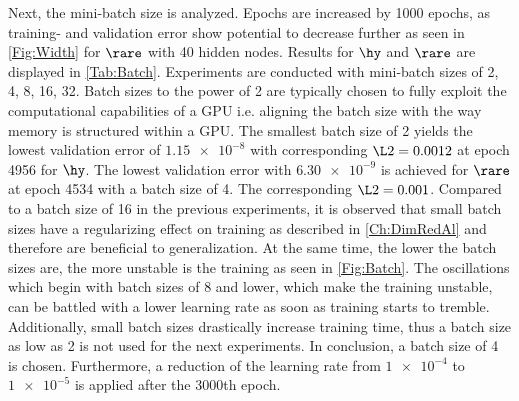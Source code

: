 Next, the mini-batch size is analyzed. Epochs are increased by 1000 epochs, as training- and validation error show potential to decrease further as seen in \cref{Fig:Width} for \(\rare\) with 40 hidden nodes. Results for $\hy$  and  $\rare$ are displayed in \cref{Tab:Batch}. Experiments are conducted with mini-batch sizes of 2, 4, 8, 16, 32. Batch sizes to the power of 2 are typically chosen to fully exploit the computational capabilities of a GPU i.e. aligning the batch size with the way memory is structured within a GPU. The smallest batch size of 2 yields the lowest validation error of \(\num{1.15e-8}\) with corresponding \(\L2 = 0.0012\) at epoch 4956 for \(\hy\). The lowest validation error with \(\num{6.30e-9}\) is achieved for \(\rare\) at epoch 4534 with a batch size of 4. The corresponding \(\L2 = 0.001\). Compared to a batch size of 16 in the previous experiments, it is observed that small batch sizes have a regularizing effect on training as described in \cref{Ch:DimRedAl} and therefore are beneficial to generalization. At the same time, the lower the batch sizes are, the more unstable is the training as seen in \cref{Fig:Batch}. The oscillations which begin with batch sizes of 8 and lower, which make the training unstable, can be battled with a lower learning rate as soon as training starts to tremble. Additionally, small batch sizes drastically increase training time, thus a batch size as low as 2 is not used for the next experiments. In conclusion, a batch size of 4 is chosen. Furthermore, a reduction of the learning rate from \(\num{1e-4}\) to \(\num{1e-5}\) is applied after the 3000th epoch.\\

